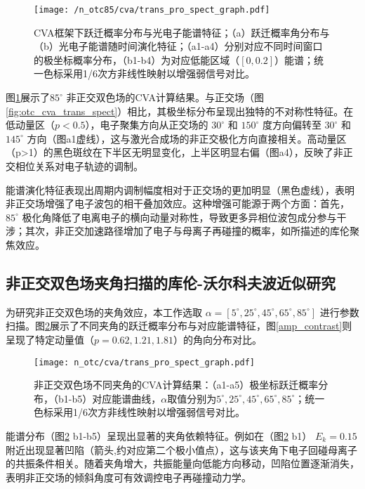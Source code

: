 \begin{figure}[!htpb]  %
	\centering
	\texttt{[image: /n\_otc85/cva/trans\_pro\_spect\_graph.pdf]}
	\caption{CVA框架下跃迁概率分布与光电子能谱特征；（a）跃迁概率角分布与（b）光电子能谱随时间演化特征；（a1-a4）分别对应不同时间窗口的极坐标概率分布，（b1-b4）为对应低能区域（$[0, 0.2]$）能谱；统一色标采用1/6次方非线性映射以增强弱信号对比。}
	\label{fig:n_otc85_cva_trans_spect}
\end{figure}

图\ref{fig:n_otc85_cva_trans_spect}展示了$85^\circ$ 非正交双色场的CVA计算结果。与正交场（图\ref{fig:otc_cva_trans_spect}）相比，其极坐标分布呈现出独特的不对称性特征。在低动量区（$p<0.5$），电子聚集方向从正交场的 $30^\circ$ 和 $150^\circ$ 度方向偏转至 $30^\circ$ 和 $145^\circ$ 方向（图a1虚线），这与激光合成场的非正交极化方向直接相关。高动量区（p>1）的黑色斑纹在下半区无明显变化，上半区明显右偏（图a4），反映了非正交相位关系对电子轨迹的调制。

能谱演化特征表现出周期内调制幅度相对于正交场的更加明显（黑色虚线），表明非正交场增强了电子波包的相干叠加效应。这种增强可能源于两个方面：首先，$85^\circ$ 极化角降低了电离电子的横向动量对称性，导致更多异相位波包成分参与干涉；其次，非正交加速路径增加了电子与母离子再碰撞的概率，如所描述的库伦聚焦效应。

\subsection{非正交双色场夹角扫描的库伦-沃尔科夫波近似研究}

为研究非正交双色场的夹角效应，本工作选取 $\alpha = [5^\circ,25^\circ,45^\circ,65^\circ,85^\circ]$ 进行参数扫描。图\ref{fig:n_otc_cva_trans_spect}展示了不同夹角的跃迁概率分布与对应能谱特征，图\ref{amp_contrast}则呈现了特定动量值（$p=0.62,1.21,1.81$）的角向分布对比。

\begin{figure}[!htpb]
	\centering
	\texttt{[image: n\_otc/cva/trans\_pro\_spect\_graph.pdf]}
	\caption{非正交双色场不同夹角的CVA计算结果：（a1-a5）极坐标跃迁概率分布，（b1-b5）对应能谱曲线，$\alpha$取值分别为$5^\circ,25^\circ,45^\circ,65^\circ,85^\circ$；统一色标采用1/6次方非线性映射以增强弱信号对比。}
	\label{fig:n_otc_cva_trans_spect}
\end{figure}

能谱分布（图\ref{fig:n_otc_cva_trans_spect} b1-b5）呈现出显著的夹角依赖特征。例如在（图\ref{fig:n_otc_cva_trans_spect} b1） $E_k=0.15$ 附近出现显著凹陷（箭头,约对应第二个极小值点），这与该夹角下电子回碰母离子的共振条件相关。随着夹角增大，共振能量向低能方向移动，凹陷位置逐渐消失，表明非正交场的倾斜角度可有效调控电子再碰撞动力学。

